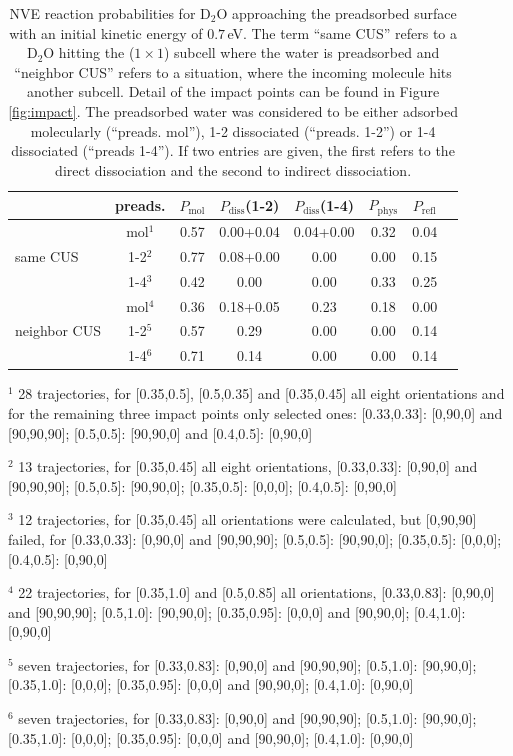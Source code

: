 \documentclass[11pt,DIV=13,BCOR=5mm,a4paper,headinclude]{scrbook}
\begin{document}
\begin{table}[hbt]
 \centering
  \caption{NVE reaction probabilities for D$_2$O approaching the preadsorbed surface with an initial kinetic energy of $0.7\,$eV.
The term ``same CUS'' refers to a D$_2$O hitting the ($1\times 1$) subcell where the water is preadsorbed and ``neighbor CUS'' refers to a situation, where the incoming molecule hits another subcell.
Detail of the impact points can be found in Figure \ref{fig:impact}.
The preadsorbed water was considered to be either adsorbed molecularly (``preads. mol''), 1-2 dissociated (``preads. 1-2'') or 1-4 dissociated (``preads 1-4'').
If two entries are given, the first refers to the direct dissociation and the second to indirect dissociation.
}
 \begin{tabular}{l|c|cccccc}
\toprule
& preads. &$P_\textrm{mol}$ & $P_\textrm{diss}$(1-2) &  $P_\textrm{diss}$(1-4) & $P_\textrm{phys}$ & $P_\textrm{refl}$ \\\midrule
\multirow{3}{*}{same CUS}& mol$^1$ &0.57 &0.00+0.04 &0.04+0.00  &0.32 &0.04 \\
& 1-2$^2$ &0.77 &0.08+0.00 &0.00 &0.00 &0.15 \\
& 1-4$^3$ &0.42 &0.00 &0.00 &0.33 &0.25 \\\hline
\multirow{3}{*}{neighbor CUS}& mol$^4$ &0.36 &0.18+0.05 &0.23 &0.18 & 0.00  \\
& 1-2$^5$ &0.57 &0.29 & 0.00  &0.00 &0.14 \\
& 1-4$^6$ &0.71 &0.14 &0.00 & 0.00 & 0.14 \\\bottomrule
\end{tabular}
\begin{tablenotes}
 \footnotesize
\item[] $^1$ 28 trajectories, for [0.35,0.5], [0.5,0.35] and [0.35,0.45] all eight orientations and for the remaining three impact points only selected ones: [0.33,0.33]: [0,90,0] and [90,90,90]; [0.5,0.5]: [90,90,0] and [0.4,0.5]: [0,90,0]
\item[]$^2$ 13 trajectories, for [0.35,0.45] all eight orientations, [0.33,0.33]: [0,90,0] and [90,90,90]; [0.5,0.5]: [90,90,0]; [0.35,0.5]: [0,0,0]; [0.4,0.5]: [0,90,0]
\item[]$^3$ 12 trajectories, for [0.35,0.45] all orientations were calculated, but [0,90,90] failed, for [0.33,0.33]: [0,90,0] and [90,90,90]; [0.5,0.5]: [90,90,0]; [0.35,0.5]: [0,0,0]; [0.4,0.5]: [0,90,0]
\item[] $^4$ 22 trajectories, for [0.35,1.0] and [0.5,0.85] all orientations, [0.33,0.83]: [0,90,0] and [90,90,90]; [0.5,1.0]: [90,90,0]; [0.35,0.95]: [0,0,0] and [90,90,0]; [0.4,1.0]: [0,90,0]
\item[]$^5$ seven trajectories, for [0.33,0.83]: [0,90,0] and [90,90,90]; [0.5,1.0]: [90,90,0]; [0.35,1.0]: [0,0,0]; [0.35,0.95]: [0,0,0] and [90,90,0]; [0.4,1.0]: [0,90,0]
\item[]$^6$ seven trajectories, for [0.33,0.83]: [0,90,0] and [90,90,90]; [0.5,1.0]: [90,90,0]; [0.35,1.0]: [0,0,0]; [0.35,0.95]: [0,0,0] and [90,90,0]; [0.4,1.0]: [0,90,0]
\end{tablenotes}
 \label{tab:enh_micro}
\end{table}
\end{document}
